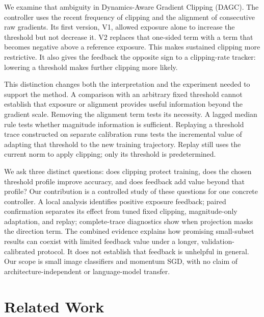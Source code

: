 \documentclass{article}
\begin{document}
We examine that ambiguity in Dynamics-Aware Gradient Clipping (DAGC). The
controller uses the recent frequency of clipping and the alignment of
consecutive raw gradients. Its first version, V1, allowed exposure alone to
increase the threshold but not decrease it. V2 replaces that one-sided term
with a term that becomes negative above a reference exposure. This makes
sustained clipping more restrictive. It also gives the feedback the opposite
sign to a clipping-rate tracker: lowering a threshold makes further clipping
more likely.

This distinction changes both the interpretation and the experiment needed to
support the method. A comparison with an arbitrary fixed threshold cannot
establish that exposure or alignment provides useful information beyond the
gradient scale. Removing the alignment term tests its necessity. A lagged
median rule tests whether magnitude information is sufficient. Replaying a
threshold trace constructed on separate calibration runs tests the incremental
value of adapting that threshold to the new training trajectory. Replay still
uses the current norm to apply clipping; only its threshold is predetermined.

We ask three distinct questions: does clipping protect training, does the
chosen threshold profile improve accuracy, and does feedback add value beyond
that profile? Our contribution is a controlled study of these questions for
one concrete controller. A local analysis identifies positive exposure
feedback; paired confirmation separates its effect from tuned fixed clipping,
magnitude-only adaptation, and replay; complete-trace diagnostics show when
projection masks the direction term. The combined evidence explains how
promising small-subset results can coexist with limited feedback value under
a longer, validation-calibrated protocol. It does not establish that feedback
is unhelpful in general. Our scope is small image classifiers and momentum
SGD, with no claim of architecture-independent or language-model transfer.

\section{Related Work}
\end{document}
